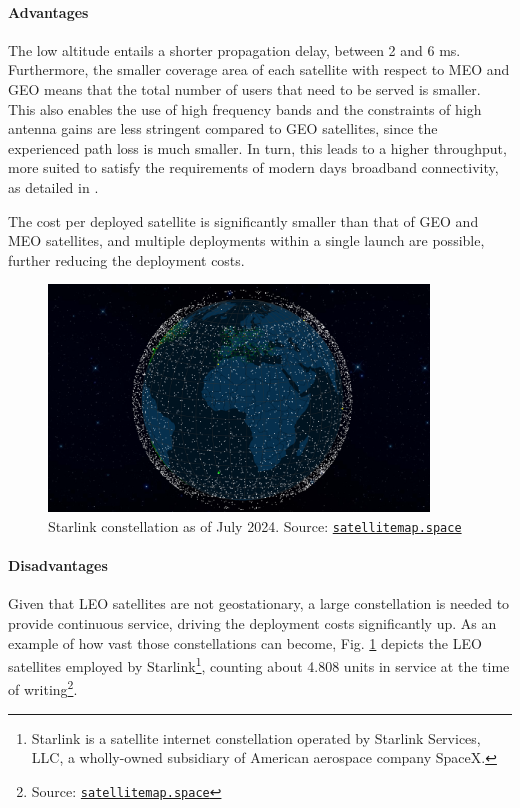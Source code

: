 \paragraph{Advantages}
The low altitude entails a shorter propagation delay, between 2 and 6 ms. Furthermore, the smaller coverage area of each satellite with respect to \ac{MEO} and \ac{GEO} means that the total number of users that need to be served is smaller. This also enables the use of high frequency bands and the constraints of high antenna gains are less stringent compared to \ac{GEO} satellites, since the experienced path loss is much smaller. In turn, this leads to a higher throughput, more suited to satisfy the requirements of modern days broadband connectivity, as detailed in \cite{satellite-communication-mmwave-giordani}.

The cost per deployed satellite is significantly smaller than that of \ac{GEO} and \ac{MEO} satellites, and multiple deployments within a single launch are possible, further reducing the deployment costs.

\begin{figure}[ht]
    \centering
    \includegraphics[width=0.9\textwidth]{res/starlink-constellation.png}
    \caption{Starlink constellation as of July 2024. Source: \href{https://satellitemap.space/}{\texttt{satellitemap.space}}}
    \label{fig:starlink_constellation}
\end{figure}

\paragraph{Disadvantages}
Given that \ac{LEO} satellites are not geostationary, a large constellation is needed to provide continuous service, driving the deployment costs significantly up. As an example of how vast those constellations can become, Fig. \ref{fig:starlink_constellation} depicts the \ac{LEO} satellites employed by Starlink\footnote{Starlink is a satellite internet constellation operated by Starlink Services, LLC, a wholly-owned subsidiary of American aerospace company SpaceX.}, counting about 4.808 units in service at the time of writing\footnote{Source: \href{https://satellitemap.space/}{\texttt{satellitemap.space}}}.


